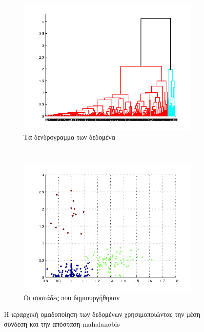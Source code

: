\documentclass{assignment}
\begin{document}
\begin{figure}[htbp]
  \centering
  \begin{subfigure}[b]{0.5\textwidth}
     \includegraphics[width=\textwidth,height=0.25\textheight]{matlab/hierarchical_dendogram_average_mahalanobis.png}
  \caption{Τα δενδρογραμμα των δεδομένα}
  \end{subfigure}%
   ~ %
  \begin{subfigure}[b]{0.5\textwidth}
    \includegraphics[width=\textwidth,height=0.25\textheight]{matlab/identified_clusters_average_mahalanobis.png}
  \caption{Οι συστάδες που δημιουργήθηκαν}
  \end{subfigure}

  \caption{Η ιεραρχική ομαδοποίηση των δεδομένων χρησιμοποιώντας την μέση σύνδεση και την απόσταση mahalanobis}
\label{fig:clustering_average_mahalanobis}
\end{figure}
\end{document}
